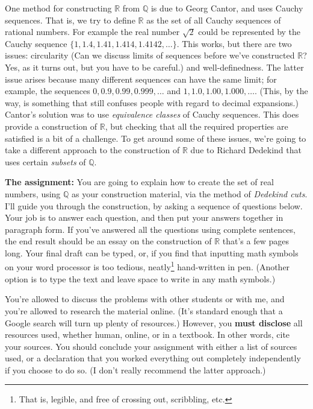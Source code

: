 \documentclass[letterpaper,12pt]{article}
\newcommand{\R}{\mathbb{R}}
\newcommand{\Q}{\mathbb{Q}}
\begin{document}
 One method for constructing $\R$ from $\Q$ is due to Georg Cantor, and uses Cauchy sequences. That is, we try to define $\R$ as the set of all Cauchy sequences of rational numbers. For example the real number $\sqrt{2}$ could be represented by the Cauchy sequence $\{1,1.4,1.41,1.414,1.4142,\ldots\}$. This works, but there are two issues: circularity (Can we discuss limits of sequences before we've constructed $\R$? Yes, as it turns out, but you have to be careful.) and well-definedness. The latter issue arises because many different sequences can have the same limit; for example, the sequences $0,0.9, 0.99, 0.999,\ldots$ and $1,1.0,1.00,1.000,\ldots$. (This, by the way, is something that still confuses people with regard to decimal expansions.) Cantor's solution was to use {\em equivalence classes} of Cauchy sequences. This does provide a construction of $\R$, but checking that all the required properties are satisfied is a bit of a challenge. To get around some of these issues, we're going to take a different approach to the construction of $\R$ due to Richard Dedekind that uses certain {\em subsets} of $\Q$.

\bigskip

{\bf The assignment:} You are going to explain how to create the set of real numbers, using $\Q$ as your construction material, via the method of {\em Dedekind cuts}. I'll guide you through the construction, by asking a sequence of questions below. Your job is to answer each question, and then put your answers together in paragraph form. If you've answered all the questions using complete sentences, the end result should be an essay on the construction of $\R$ that's a few pages long. Your final draft can be typed, or, if you find that inputting math symbols on your word processor is too tedious, neatly\footnote{That is, legible, and free of crossing out, scribbling, etc.} hand-written in pen. (Another option is to type the text and leave space to write in any math symbols.)

You're allowed to discuss the problems with other students or with me, and you're allowed to research the material online. (It's standard enough that a Google search will turn up plenty of resources.) However, you {\bf must disclose} all resources used, whether human, online, or in a textbook. In other words, cite your sources. You should conclude your assignment with either a list of sources used, or a declaration that you worked everything out completely independently if you choose to do so. (I don't really recommend the latter approach.)
\end{document}

